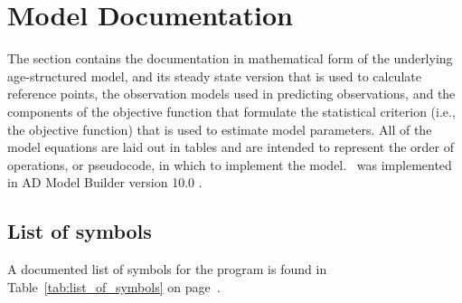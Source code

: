 \section{Model Documentation} %
\label{sec:model_documentation}

\begin{multicols}{2}

The section contains the documentation in mathematical form of the underlying age-structured model, and its steady state version that is used to calculate reference points, the observation models used in predicting observations, and the components of the objective function that formulate the statistical criterion (i.e., the objective function) that is used to estimate model parameters.  All of the model equations are laid out in tables and are intended to represent the order of operations, or pseudocode, in which to implement the model.  \iscam\ was implemented in AD Model Builder version 10.0 \citep{otterResearch,ADMB2009}.

\subsection{List of symbols} %
\label{sub:list_of_symbols}
A documented list of symbols for the \iscam program is found in Table~\ref{tab:list_of_symbols} on page~\pageref{tab:list_of_symbols}.



\end{multicols}


